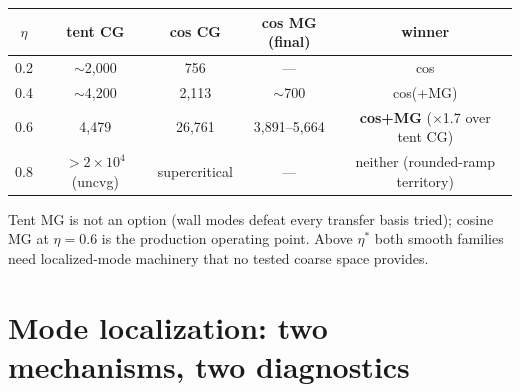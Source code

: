 \documentclass[11pt]{article}
\begin{document}
\begin{center}
\begin{tabular}{ccccc}
\toprule
$\eta$ & tent CG & cos CG & cos MG (final) & winner \\
\midrule
0.2 & $\sim$2{,}000 & 756 & --- & cos \\
0.4 & $\sim$4{,}200 & 2{,}113 & $\sim$700 & cos(+MG) \\
0.6 & 4{,}479 & 26{,}761 & 3{,}891--5{,}664 & \textbf{cos+MG} ($\times$1.7 over tent CG) \\
0.8 & $>2\times10^4$ (uncvg) & supercritical & --- & neither (rounded-ramp territory) \\
\bottomrule
\end{tabular}
\end{center}

Tent MG is not an option (wall modes defeat every transfer basis
tried); cosine MG at $\eta=0.6$ is the production operating point.
Above $\eta^{*}$ both smooth families need localized-mode machinery
that no tested coarse space provides.

\section{Mode localization: two mechanisms, two diagnostics}
\end{document}
